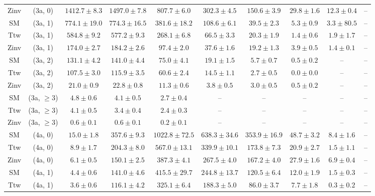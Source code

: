 \begin{table}[h!]
{\begin{tabular}{cccccccccc}
	Zinv & (3a, 0) & $1412.7\pm 8.3$ & $1497.0\pm 7.8$ & $807.7\pm 6.0$ & $302.3\pm 4.5$ & $150.6\pm 3.9$ & $29.8\pm 1.6$ & $12.3\pm 0.4$ & -- \\[0.5ex] 
	SM & (3a, 1) & $774.1\pm 19.0$ & $774.3\pm 16.5$ & $381.6\pm 18.2$ & $108.6\pm 6.1$ & $39.5\pm 2.3$ & $5.3\pm 0.9$ & $3.3\pm 80.5$ & -- \\[0.5ex] 
	Ttw & (3a, 1) & $584.8\pm 9.2$ & $577.2\pm 9.3$ & $268.1\pm 6.8$ & $66.5\pm 3.3$ & $20.3\pm 1.9$ & $1.4\pm 0.6$ & $1.9\pm 1.7$ & -- \\[0.5ex] 
	Zinv & (3a, 1) & $174.0\pm 2.7$ & $184.2\pm 2.6$ & $97.4\pm 2.0$ & $37.6\pm 1.6$ & $19.2\pm 1.3$ & $3.9\pm 0.5$ & $1.4\pm 0.1$ & -- \\[0.5ex] 
	SM & (3a, 2) & $131.1\pm 4.2$ & $141.0\pm 4.4$ & $75.0\pm 4.1$ & $19.1\pm 1.5$ & $5.7\pm 0.7$ & $0.5\pm 0.2$ & -- & -- \\[0.5ex] 
	Ttw & (3a, 2) & $107.5\pm 3.0$ & $115.9\pm 3.5$ & $60.6\pm 2.4$ & $14.5\pm 1.1$ & $2.7\pm 0.5$ & $0.0\pm 0.0$ & -- & -- \\[0.5ex] 
	Zinv & (3a, 2) & $21.0\pm 0.9$ & $22.8\pm 0.8$ & $11.3\pm 0.6$ & $3.8\pm 0.5$ & $3.0\pm 0.5$ & $0.5\pm 0.2$ & -- & -- \\[0.5ex] 
	SM & (3a, $\ge3$) & $4.8\pm 0.6$ & $4.1\pm 0.5$ & $2.7\pm 0.4$ & -- & -- & -- & -- & -- \\[0.5ex] 
	Ttw & (3a, $\ge3$) & $4.1\pm 0.5$ & $3.4\pm 0.4$ & $2.4\pm 0.3$ & -- & -- & -- & -- & -- \\[0.5ex] 
	Zinv & (3a, $\ge3$) & $0.6\pm 0.1$ & $0.6\pm 0.1$ & $0.2\pm 0.1$ & -- & -- & -- & -- & -- \\[0.5ex] 
	SM & (4a, 0) & $15.0\pm 1.8$ & $357.6\pm 9.3$ & $1022.8\pm 72.5$ & $638.3\pm 34.6$ & $353.9\pm 16.9$ & $48.7\pm 3.2$ & $8.4\pm 1.6$ & -- \\[0.5ex] 
	Ttw & (4a, 0) & $8.9\pm 1.7$ & $204.3\pm 8.0$ & $567.0\pm 13.1$ & $339.9\pm 10.1$ & $173.8\pm 7.3$ & $20.9\pm 2.7$ & $1.5\pm 1.1$ & -- \\[0.5ex] 
	Zinv & (4a, 0) & $6.1\pm 0.5$ & $150.1\pm 2.5$ & $387.3\pm 4.1$ & $267.5\pm 4.0$ & $167.2\pm 4.0$ & $27.9\pm 1.6$ & $6.9\pm 0.4$ & -- \\[0.5ex] 
	SM & (4a, 1) & $4.4\pm 0.6$ & $141.0\pm 4.6$ & $415.5\pm 29.7$ & $244.8\pm 13.7$ & $120.5\pm 6.4$ & $12.0\pm 1.9$ & $1.5\pm 0.3$ & -- \\[0.5ex] 
	Ttw & (4a, 1) & $3.6\pm 0.6$ & $116.1\pm 4.2$ & $325.1\pm 6.4$ & $188.3\pm 5.0$ & $86.0\pm 3.7$ & $7.7\pm 1.8$ & $0.3\pm 0.2$ & -- \\[0.5ex] 

\end{tabular}}
\end{table}
